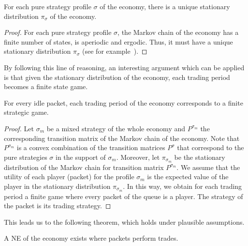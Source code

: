 \documentclass[letterpaper,10pt]{llncs}
\newcommand{\hla}[1]{\hl{#1}}
\renewcommand{\hla}[1]{#1}
\begin{document}
\begin{lemma}
\label{lem:sce1pi}
For each pure strategy profile $\sigma$ of the economy, there is a unique stationary distribution $\pi_\sigma$ of the economy.
\end{lemma}
\begin{proof}
For each pure strategy profile $\sigma$, the Markov chain of the economy has a finite number of states, is aperiodic and ergodic. Thus, it must have a unique stationary distribution $\pi_\sigma$
(see for example~\cite[Theorem 7.7]{Mitzenmacher:2005:PCR}).
\end{proof}

\noindent
By following this line of reasoning, an interesting argument which can be applied is that
given the stationary distribution of the economy, each trading period becomes a finite state game. 

\begin{lemma}
\label{lem:FiniteGame}
For every idle packet, each trading period of the economy corresponds to a finite strategic game.
\end{lemma}

\begin{proof}
Let $\sigma_m$ be a mixed strategy of the whole economy and $P^{\sigma_m}$ the corresponding transition matrix of the Markov chain of the economy. 
\hla{Note that $P^{\sigma_m}$ is a convex combination of the transition
matrices $P^{\sigma}$ that correspond to the pure strategies $\sigma$ in the support of $\sigma_m$.}
Moreover, let $\pi_{\sigma_m}$ be the stationary distribution of the Markov chain for
transition matrix $P^{\sigma_m}$. We assume that the utility of each player (packet) 
for the profile $\sigma_m$ is the expected value of the player in the stationary 
distribution $\pi_{\sigma_m}$. In this way, we obtain for each trading period a finite 
game where every packet of the queue is a player. The strategy of the packet is its 
trading strategy. 
\end{proof}

\noindent
This leads us to the following theorem, which holds under plausible assumptions.

\begin{theorem}
\label{the:scenario1}
A NE of the economy exists where packets perform trades.
\end{theorem}
\end{document}

